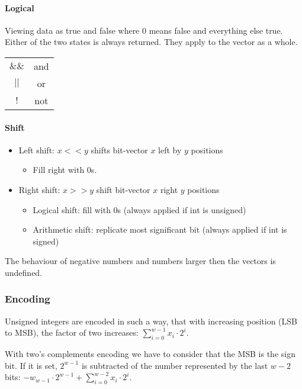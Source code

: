 \paragraph{Logical}
Viewing data as true and false where $0$ means false and everything else true. Either of the two states is always returned. They apply to the vector as a whole.

\begin{tabular}{c | c}
    $\&\&$ & and\\
    $||$ & or\\
    $!$ & not
\end{tabular}

\paragraph{Shift}
\begin{itemize}
    \item Left shift: $x << y$ shifts bit-vector $x$ left by $y$ positions
        \begin{itemize}
            \item Fill right with $0$s.
        \end{itemize}
    \item Right shift: $x >> y$ shift bit-vector $x$ right $y$ positions
        \begin{itemize}
            \item Logical shift: fill with $0$s (always applied if int is unsigned)
            \item Arithmetic shift: replicate most significant bit (always applied if int is signed)
        \end{itemize}
\end{itemize}

The behaviour of negative numbers and numbers larger then the vectors is undefined.

\subsubsection{Encoding}
Unsigned integers are encoded in such a way, that with increasing position (LSB to MSB), the factor of two increases: $\sum_{i=0}^{w-1} x_i \cdot 2^i$.

With two's complements encoding we have to consider that the MSB is the sign bit. If it is set, $2^{w-1}$ is subtracted of the number represented by the last $w-2$ bits: $-w_{w - 1} \cdot 2^{w - 1} + \sum_{i=0}^{w - 2} x_i \cdot 2^i$.

